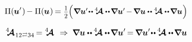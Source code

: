 \nopagebreak\vspace{-0.2em}
\begin{equation*}
\potentialenergydensity (
   \hspace{-0.1ex} \bm{u}' \hspace{.1ex}
) \hspace{-0.2ex}
- \potentialenergydensity (
   \hspace{-0.1ex} \bm{u} \hspace{.1ex}
) \hspace{-0.2ex}
= \smalldisplaystyleonehalf \hspace{-0.1ex}
\scalebox{.95}{$
  \Bigl( \hspace{.1ex}
    \boldnabla \bm{u}'
    \hspace{-0.4ex} \dotdotp \hspace{-0.1ex}
    \stiffnesstensor
    \dotdotp \hspace{-0.25ex}
    \boldnabla \bm{u}' 
    \hspace{-0.25ex} - \hspace{-0.2ex}
    \boldnabla \bm{u}
    \dotdotp
    \stiffnesstensor
    \dotdotp \hspace{-0.25ex}
    \boldnabla \bm{u}
  \hspace{.1ex} \Bigr)
$}
\end{equation*}

\begin{equation*}
\stiffnesstensor_{\hspace{.12ex} \indexjuggling{12}{34}} \hspace{-0.25ex}
= \stiffnesstensor
\hspace{.4em}\Rightarrow\hspace{.25em}
\boldnabla \bm{u}
\dotdotp \hspace{-0.1ex}
\stiffnesstensor
\dotdotp \hspace{-0.25ex}
\boldnabla \bm{u}' \hspace{-0.25ex}
= \hspace{-0.2ex}
\boldnabla \bm{u}'
\hspace{-0.4ex} \dotdotp \hspace{-0.1ex}
\stiffnesstensor
\dotdotp \hspace{-0.25ex}
\boldnabla \bm{u}
\end{equation*}

